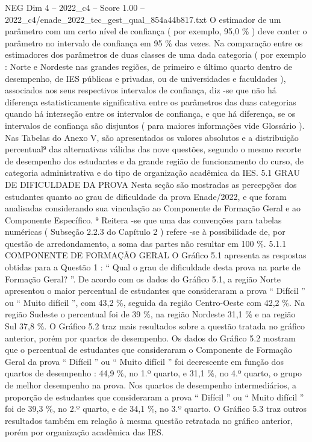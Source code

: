 \begin{textsample}{NEG Dim 4 – 2022\_c4 – Score 1.00 – 2022\_c4/enade\_2022\_tec\_gest\_qual\_854a44b817.txt}
O estimador de um parâmetro com um certo nível de confiança ( por exemplo, 95,0 \% ) deve conter o parâmetro no intervalo de confiança em 95 \% das vezes.
Na comparação entre os estimadores dos parâmetros de duas classes de uma dada categoria ( por exemplo : Norte e Nordeste nas grandes regiões, de primeiro e último quarto dentro de desempenho, de IES públicas e privadas, ou de universidades e faculdades ), associados aos seus respectivos intervalos de confiança, diz -se que não há diferença estatisticamente significativa entre os parâmetros das duas categorias quando há interseção entre os intervalos de confiança, e que há diferença, se os intervalos de confiança são disjuntos ( para maiores informações vide Glossário ).
Nas Tabelas do Anexo V, são apresentados os valores absolutos e a distribuição percentual⁹ das alternativas válidas das nove questões, segundo o mesmo recorte de desempenho dos estudantes e da grande região de funcionamento do curso, de categoria administrativa e do tipo de organização acadêmica da IES. 5.1 GRAU DE DIFICULDADE DA PROVA Nesta seção são mostradas as percepções dos estudantes quanto ao grau de dificuldade da prova Enade/2022, e que foram analisadas considerando sua vinculação ao Componente de Formação Geral e ao Componente Específico. ⁹ Reitera -se que uma das convenções para tabelas numéricas ( Subseção 2.2.3 do Capítulo 2 ) refere -se à possibilidade de, por questão de arredondamento, a soma das partes não resultar em 100 \%. 5.1.1 COMPONENTE DE FORMAÇÃO GERAL O Gráfico 5.1 apresenta as respostas obtidas para a Questão 1 : “ Qual o grau de dificuldade desta prova na parte de Formação Geral? ”.
De acordo com os dados do Gráfico 5.1, a região Norte apresentou o maior percentual de estudantes que consideraram a prova “ Difícil ” ou “ Muito difícil ”, com 43,2 \%, seguida da região Centro-Oeste com 42,2 \%.
Na região Sudeste o percentual foi de 39 \%, na região Nordeste 31,1 \% e na região Sul 37,8 \%.
O Gráfico 5.2 traz mais resultados sobre a questão tratada no gráfico anterior, porém por quartos de desempenho.
Os dados do Gráfico 5.2 mostram que o percentual de estudantes que consideraram o Componente de Formação Geral da prova “ Difícil ” ou “ Muito difícil ” foi decrescente em função dos quartos de desempenho : 44,9 \%, no 1.º quarto, e 31,1 \%, no 4.º quarto, o grupo de melhor desempenho na prova.
Nos quartos de desempenho intermediários, a proporção de estudantes que consideraram a prova “ Difícil ” ou “ Muito difícil ” foi de 39,3 \%, no 2.º quarto, e de 34,1 \%, no 3.º quarto.
O Gráfico 5.3 traz outros resultados também em relação à mesma questão retratada no gráfico anterior, porém por organização acadêmica das IES.

\end{textsample}
